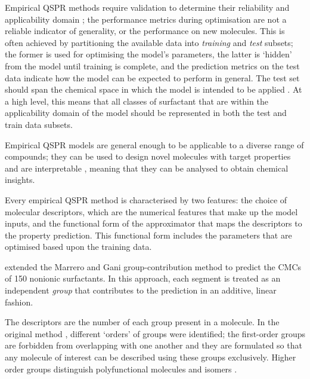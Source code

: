 Empirical QSPR methods require validation to determine their reliability and
applicability domain
\cite{veerasamyValidationQSARModelsstrategies2011,tropshaBestPracticesQSAR2010,leonardSelectionTrainingTest2006};
the performance metrics during optimisation are not a reliable indicator of
generality, or the performance on new molecules. This is often achieved by
partitioning the available data into \emph{training} and \emph{test} subsets;
the former is used for optimising the model's parameters, the latter is `hidden'
from the model until training is complete, and the prediction metrics on the
test data indicate how the model can be expected to perform in general. The test
set should span the chemical space in which the model is intended to be applied
\cite{leonardSelectionTrainingTest2006}. At a high level, this means that all
classes of surfactant that are within the applicability domain of the model
should be represented in both the test and train data subsets.

Empirical QSPR models are general enough to be applicable to a diverse range of
compounds; they can be used to design novel molecules with target properties
\cite{gantzerInverseQSPRNovoDesign2020,bolboacaMolecularDesignQSARs2013} and are
interpretable \cite{zefirovFragmentalApproachQSPR2002}, meaning that they can be
analysed to obtain chemical insights.

Every empirical QSPR method is characterised by two features: the choice of
molecular descriptors, which are the numerical features that make up the model
inputs, and the functional form of the approximator that maps the descriptors to
the property prediction. This functional form includes the parameters that are
optimised based upon the training data.

\citet{matteiModelingCriticalMicelle2013} extended the Marrero and Gani
group-contribution method \cite{ganiAutomaticCreationMissing2005} to predict the
CMCs of 150 nonionic surfactants. In this approach, each segment is treated as
an independent \emph{group} that contributes to the prediction in an additive,
linear fashion.

The descriptors are the number of each group present in a molecule. In the
original method \cite{ganiAutomaticCreationMissing2005}, different `orders' of
groups were identified; the first-order groups are forbidden from overlapping
with one another and they are formulated so that any molecule of interest can be
described using these groups exclusively. Higher order groups distinguish
polyfunctional molecules and isomers \cite{ganiAutomaticCreationMissing2005}.

